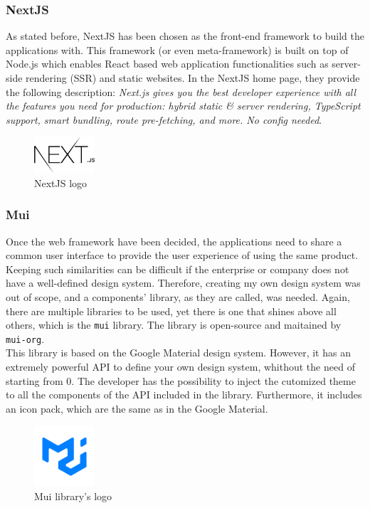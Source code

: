 \documentclass[a4paper, 12pt, oneside]{book}
\begin{document}
\subsubsection{NextJS}
As stated before, NextJS has been chosen as the front-end framework to build the applications with. This framework (or even meta-framework) is built on top of Node.js which enables React based web application functionalities such as server-side rendering (SSR) and static websites. In the NextJS home page, they provide the following description: \emph{Next.js gives you the best developer experience with all the features you need for production: hybrid static \& server rendering, TypeScript support, smart bundling, route pre-fetching, and more. No config needed}.
\\
\begin{figure}[h!]
	\centering
	\includegraphics[width=0.2\textwidth]{assets/next-logo.png}
	\caption{NextJS logo}
\end{figure}
\subsubsection{Mui}
Once the web framework have been decided, the applications need to share a common user interface to provide the user experience of using the same product. Keeping such similarities can be difficult if the enterprise or company does not have a well-defined design system. Therefore, creating my own design system was out of scope, and a components' library, as they are called, was needed. Again, there are multiple libraries to be used, yet there is one that shines above all others, which is the \texttt{mui} library. The library is open-source and maitained by \texttt{mui-org}.
\\[8pt]   
This library is based on the Google Material design system. However, it has an extremely powerful API to define your own design system, whithout the need of starting from 0. The developer has the possibility to inject the cutomized theme to all the components of the API included in the library. Furthermore, it includes an icon pack, which are the same as in the Google Material.
\\
\begin{figure}[h!]
	\centering
	\includegraphics[width=0.2\textwidth]{assets/mui-logo.png}
	\caption{Mui library's logo}
\end{figure}
\end{document}
